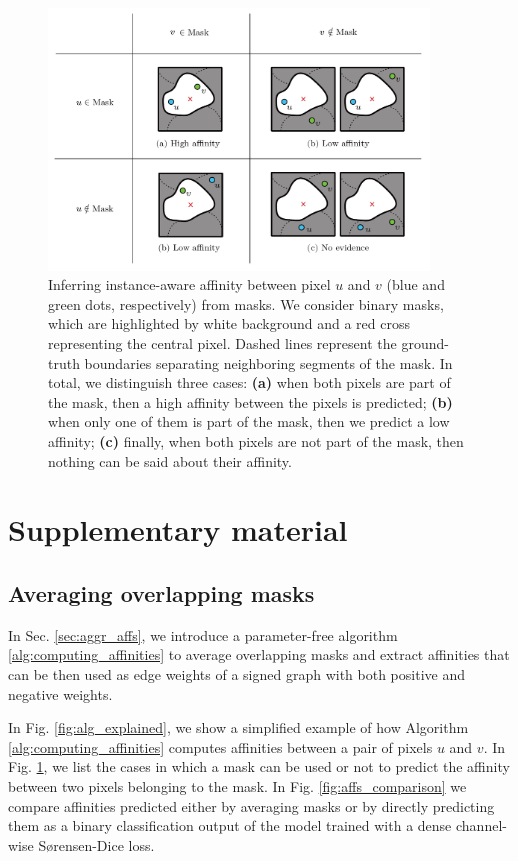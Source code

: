 
\begin{figure}[b]
\centering
        \includegraphics[width=0.9\textwidth]{./figs/mask_cases.pdf} %
        \caption{Inferring instance-aware affinity between pixel $u$ and $v$ (blue and green dots, respectively) from \maskname masks. We consider binary \maskname masks, which are highlighted by white background and a red cross representing the central pixel. Dashed lines represent the ground-truth boundaries separating neighboring segments of the \maskname mask. In total, we distinguish three cases: \textbf{(a)} when both pixels are part of the mask, then a high affinity between the pixels is predicted; \textbf{(b)} when only one of them is part of the mask, then we predict a low affinity; \textbf{(c)} finally, when both pixels are not part of the mask, then nothing can be said about their affinity.}
    \label{fig:mask_cases}
\end{figure}

\section{Supplementary material}
\subsection{Averaging overlapping masks}
In Sec. \ref{sec:aggr_affs}, we introduce a parameter-free algorithm \ref{alg:computing_affinities} to average overlapping masks and extract affinities that can be then used as edge weights of a signed graph with both positive and negative weights. 

In Fig. \ref{fig:alg_explained}, we show a simplified example of how Algorithm \ref{alg:computing_affinities} computes affinities between a pair of pixels $u$ and $v$.
In Fig. \ref{fig:mask_cases}, we list the cases in which a \maskname mask can be used or not to predict the affinity between two pixels belonging to the mask.  
In Fig. \ref{fig:affs_comparison} we compare affinities predicted either by averaging \maskname masks or by directly predicting them as a binary classification output of the model trained with a dense channel-wise S\o rensen-Dice loss.

